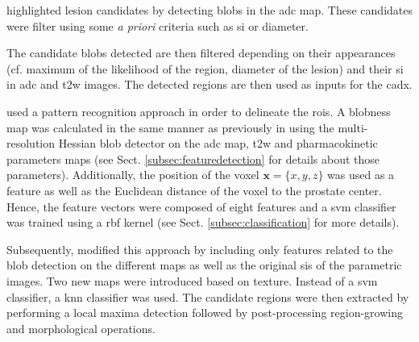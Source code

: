 \cite{Vos2012} highlighted lesion candidates by detecting blobs in the \ac{adc} map. These candidates were filter using some \textit{a priori} criteria such as \ac{si} or diameter.%
%
%
%

The candidate blobs detected are then filtered depending on their appearances (cf. maximum of the likelihood of the region, diameter of the lesion) and their \ac{si} in \ac{adc} and \ac{t2w} images. The detected regions are then used as inputs for the \ac{cadx}.

\cite{Litjens2011} used a pattern recognition approach in order to delineate the \acp{roi}. A blobness map was calculated in the same manner as previously in \cite{Vos2010} using the multi-resolution Hessian blob detector on the \ac{adc} map, \ac{t2w} and pharmacokinetic parameters maps (see Sect. \ref{subsec:featuredetection} for details about those parameters). Additionally, the position of the voxel $\mathbf{x}=\{x,y,z\}$ was used as a feature as well as the Euclidean distance of the voxel to the prostate center. Hence, the feature vectors were composed of eight features and a \ac{svm} classifier was trained using a \ac{rbf} kernel (see Sect. \ref{subsec:classification} for more details).

Subsequently, \cite{Litjens2012} modified this approach by including only features related to the blob detection on the different maps as well as the original \acp{si} of the parametric images. Two new maps were introduced based on texture. Instead of a \ac{svm} classifier, a \ac{knn} classifier was used. The candidate regions were then extracted by performing a local maxima detection followed by post-processing region-growing and morphological operations. 